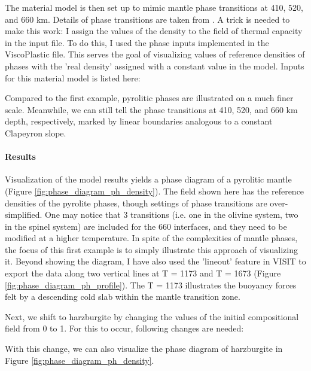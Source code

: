 \par The material model is then set up to mimic mantle phase transitions at 410, 520, and 660 km.%
Details of phase transitions are taken from \cite{billen2018decoupling}.
A trick is needed to make this work: I assign the values of the density to the field of thermal capacity in the input file. %
To do this, I used the phase inputs implemented in the ViscoPlastic file.
This serves the goal of visualizing values of reference densities of phases with the 'real density' assigned with a constant value in the model.
Inputs for this material model is listed here:

Compared to the first example, pyrolitic phases are illustrated on a much finer scale.  %
Meanwhile, we can still tell the phase transitions at 410, 520, and 660 km depth, respectively, marked by linear boundaries analogous to a constant Clapeyron slope.


\paragraph{Results}

\par Visualization of the model results yields a phase diagram of a pyrolitic mantle (Figure \ref{fig:phase_diagram_ph_density}). %
The field shown here has the reference densities of the pyrolite phases, though settings of phase transitions are over-simplified.
One may notice that 3 transitions (i.e. one in the olivine system, two in the spinel system) are included for the 660 interfaces, %
and they need to be modified at a higher temperature.
In spite of the complexities of mantle phases, the focus of this first example is to simply illustrate this approach of visualizing it.
Beyond showing the diagram, I have also used the 'lineout' feature in VISIT to export the data along two vertical lines at T = 1173 and T = 1673 (Figure \ref{fig:phase_diagram_ph_profile}). %
The T = 1173 illustrates the buoyancy forces felt by a descending cold slab within the mantle transition zone.

\par Next, we shift to harzburgite by changing the values of the initial compositional field from 0 to 1.  %
For this to occur, following changes are needed:

With this change, we can also visualize the phase diagram of harzburgite in Figure \ref{fig:phase_diagram_ph_density}.

